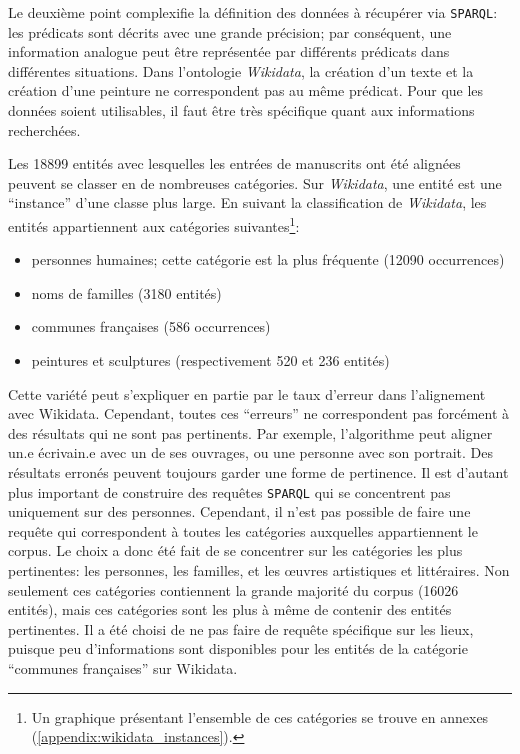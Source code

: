 \documentclass[a4paper, 12pt, twoside]{book}
\newcommand{\sparql}{\texttt{\gls{SPARQL}}}
\newcommand{\wkd}{\textit{Wikidata}}
\begin{document}
Le deuxième point complexifie la définition des données à récupérer via \sparql{}: les prédicats sont décrits avec une grande précision; par conséquent, une information analogue peut être représentée par différents prédicats dans différentes situations. Dans l'ontologie \wkd{}, la création d'un texte et la création d'une peinture ne correspondent pas au même prédicat. Pour que les données soient utilisables, il faut être très spécifique quant aux informations recherchées. 

Les 18899 entités avec lesquelles les entrées de manuscrits ont été alignées peuvent se classer en de nombreuses catégories. Sur \wkd{}, une entité est une \enquote{instance} d'une classe plus large. En suivant la classification de \wkd{}, les entités appartiennent aux catégories suivantes\footnote{Un graphique présentant l'ensemble de ces catégories se trouve en annexes (\ref{appendix:wikidata_instances}).}:
\begin{itemize}
	\item personnes humaines; cette catégorie est la plus fréquente (12090 occurrences)
	\item noms de familles (3180 entités)
	\item communes françaises (586 occurrences)
	\item peintures et sculptures (respectivement 520 et 236 entités)
\end{itemize}

Cette variété peut s'expliquer en partie par le taux d'erreur dans l'alignement avec Wikidata. Cependant, toutes ces \enquote{erreurs} ne correspondent pas forcément à des résultats qui ne sont pas pertinents. Par exemple, l'algorithme peut aligner un.e écrivain.e avec un de ses ouvrages, ou une personne avec son portrait. Des résultats erronés peuvent toujours garder une forme de pertinence. Il est d'autant plus important de construire des requêtes \sparql{} qui se concentrent pas uniquement sur des personnes. Cependant, il n'est pas possible de faire une requête qui correspondent à toutes les catégories auxquelles appartiennent le corpus. Le choix a donc été fait de se concentrer sur les catégories les plus pertinentes: les personnes, les familles, et les œuvres artistiques et littéraires. Non seulement ces catégories contiennent la grande majorité du corpus (16026 entités), mais ces catégories sont les plus à même de contenir des entités pertinentes. Il a été choisi de ne pas faire de requête spécifique sur les lieux, puisque peu d'informations sont disponibles pour les entités de la catégorie \enquote{communes françaises} sur Wikidata.
\end{document}
